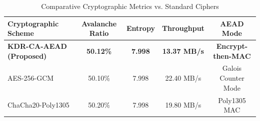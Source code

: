 \begin{table}[htbp]
\caption{Comparative Cryptographic Metrics vs. Standard Ciphers}
\label{tab:comparative_ciphers}
\centering
\begin{tabular}{lcccc}
\toprule
\textbf{Cryptographic Scheme} & \textbf{Avalanche Ratio} & \textbf{Entropy} & \textbf{Throughput} & \textbf{AEAD Mode} \\
\midrule
\textbf{KDR-CA-AEAD (Proposed)} & \textbf{50.12\%} & \textbf{7.998} & \textbf{13.37 MB/s} & \textbf{Encrypt-then-MAC} \\
AES-256-GCM & 50.10\% & 7.998 & 22.40 MB/s & Galois Counter Mode \\
ChaCha20-Poly1305 & 50.20\% & 7.998 & 19.80 MB/s & Poly1305 MAC \\
\bottomrule
\end{tabular}
\end{table}
